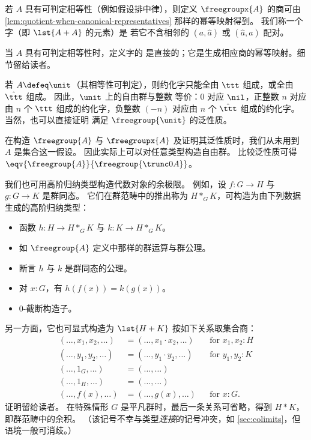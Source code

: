 %

若 $A$ 具有可判定相等性（例如假设排中律），则定义 $\freegroupx{A}$ 的商可由 \cref{lem:quotient-when-canonical-representatives} 那样的幂等映射得到。
我们称一个字（即 $\lst{A+A}$ 的元素）是
若它不含相邻的 $(a,\hat a)$ 或 $(\hat a,a)$ 配对。

当 $A$ 具有可判定相等性时，定义字的
%
是直接的；它是生成相应商的幂等映射。细节留给读者。

若 $A\defeq \unit$（其相等性可判定），则约化字只能全由 $\ttt$ 组成，或全由 $\hat{\ttt}$ 组成。
因此，$\unit$ 上的自由群与整数 \Z 等价：$0$ 对应 $\nil$，正整数 $n$ 对应由 $n$ 个 $\ttt$ 组成的约化字，负整数 $(-n)$ 对应由 $n$ 个 $\hat{\ttt}$ 组成的约化字。
当然，也可以直接证明 \Z 满足 $\freegroup{\unit}$ 的泛性质。

\begin{rmk}\label{thm:freegroup-nonset}
  在构造 $\freegroup{A}$ 与 $\freegroupx{A}$ 及证明其泛性质时，我们从未用到 $A$ 是集合这一假设。
  因此实际上可以对任意类型构造自由群。
  比较泛性质可得 $\eqv{\freegroup{A}}{\freegroup{\trunc0A}}$。
\end{rmk}

%

%
我们也可用高阶归纳类型构造代数对象的余极限。
例如，设 $f:G\to H$ 与 $g:G\to K$ 是群同态。
它们在群范畴中的推出称为
%
%
$H *_G K$，可构造为由下列数据生成的高阶归纳类型：
\begin{itemize}
\item 函数 $h:H\to H *_G K$ 与 $k:K\to H *_G K$。
\item 如 $\freegroup{A}$ 定义中那样的群运算与群公理。
\item 断言 $h$ 与 $k$ 是群同态的公理。
\item 对 $x:G$，有 $h(f(x)) = k(g(x))$。
\item $0$-截断构造子。
\end{itemize}
另一方面，它也可显式构造为 $\lst{H+K}$ 按如下关系取集合商：
\begin{align*}
  (\dots, x_1, x_2, \dots) &= (\dots, x_1\cdot x_2, \dots)
  & &\text{for $x_1,x_2:H$}\\
  (\dots, y_1, y_2, \dots) &= (\dots, y_1\cdot y_2, \dots)
  & &\text{for $y_1,y_2:K$}\\
  (\dots, 1_G, \dots) &= (\dots, \dots) &&  \\
  (\dots, 1_H, \dots) &= (\dots, \dots) &&  \\
  (\dots, f(x), \dots) &= (\dots, g(x), \dots)
  & &\text{for $x:G$.}
\end{align*}
证明留给读者。
在特殊情形 $G$ 是平凡群时，最后一条关系可省略，得到
%
$H*K$，即群范畴中的余积。
（该记号不幸与类型\emph{连接}的记号冲突，如 \cref{sec:colimits}，但语境一般可消歧。）

